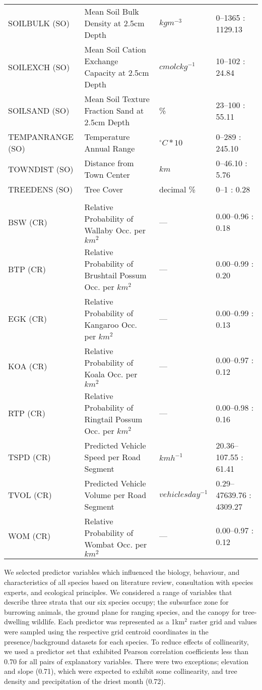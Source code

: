 \begin{table}[htp]
\begin{tabularx}{0.9\textwidth}{lYll}
SOILBULK (SO)   &Mean Soil Bulk Density at 2.5cm Depth                    &$kg m^{-3}$    &0--1365 : 1129.13\\
SOILEXCH (SO)   &Mean Soil Cation Exchange Capacity at 2.5cm Depth        &$cmolc kg^{-1}$     &10--102 : 24.84\\
SOILSAND (SO)   &Mean Soil Texture Fraction Sand at 2.5cm Depth           &\%             &23--100 : 55.11\\
TEMPANRANGE (SO)&Temperature Annual Range                                 &$^{\circ}C*10$ &0--289 : 245.10\\
TOWNDIST (SO)   &Distance from Town Center                                &$km$           &0--46.10 : 5.76\\
TREEDENS (SO)   &Tree Cover                                               &decimal \%     &0--1 : 0.28\\
&&&\\
BSW (CR)        &Relative Probability of Wallaby Occ. per $km^2$          &---            &0.00--0.96 : 0.18\\
BTP (CR)        &Relative Probability of Brushtail Possum Occ. per $km^2$ &---            &0.00--0.99 : 0.20\\
EGK (CR)        &Relative Probability of Kangaroo Occ. per $km^2$         &---            &0.00--0.99 : 0.13\\
KOA (CR)        &Relative Probability of Koala Occ. per $km^2$            &---            &0.00--0.97 : 0.12\\
RTP (CR)        &Relative Probability of Ringtail Possum Occ. per $km^2$  &---            &0.00--0.98 : 0.16\\
TSPD (CR)       &Predicted Vehicle Speed per Road Segment                 &$km h^{-1}$    &20.36--107.55 : 61.41\\
TVOL (CR)       &Predicted Vehicle Volume per Road Segment                &$vehicles day^{-1}$ &0.29--47639.76 : 4309.27\\
WOM (CR)        &Relative Probability of Wombat Occ. per $km^2$           &---            &0.00--0.97 : 0.12\\
\bottomrule
\end{tabularx}
\label{6sp_variables}
\end{table}

We selected predictor variables which influenced the biology, behaviour, and characteristics of all species based on literature review, consultation with species experts, and ecological principles. We considered a range of variables that describe three strata that our six species occupy; the subsurface zone for burrowing animals, the ground plane for ranging species, and the canopy for tree-dwelling wildlife. Each predictor was represented as a 1km$^2$ raster grid and values were sampled using the respective grid centroid coordinates in the presence/background datasets for each species. To reduce effects of collinearity, we used a predictor set that exhibited Pearson correlation coefficients less than 0.70 for all pairs of explanatory variables. There were two exceptions; elevation and slope (0.71), which were expected to exhibit some collinearity, and tree density and precipitation of the driest month (0.72).

